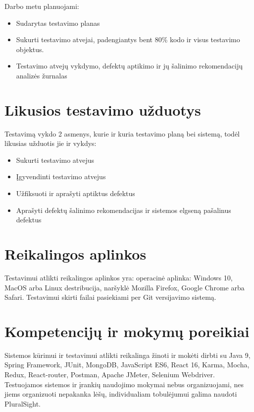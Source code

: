 \documentclass{VUMIFPSkursinis}
\begin{document}
    Darbo metu planuojami: 

    \begin{itemize}
    	\item Sudarytas testavimo planas
    	\item Sukurti testavimo atvejai, padengiantys bent 80\% kodo ir visus testavimo objektus.
    	\item Testavimo atvejų vykdymo, defektų aptikimo ir jų šalinimo rekomendacijų analizės žurnalas
    \end{itemize}

    \section{Likusios testavimo užduotys}

    Testavimą vykdo 2 asmenys, kurie ir kuria testavimo planą bei sistemą, todėl likusias užduotis jie ir vykdys:

    \begin{itemize}
    	\item Sukurti testavimo atvejus
    	\item Įgyvendinti testavimo atvejus
    	\item Užfiksuoti ir aprašyti aptiktus defektus
    	\item Aprašyti defektų šalinimo rekomendacijas ir sistemos elgseną pašalinus defektus
    \end{itemize}

    \section{Reikalingos aplinkos}

    Testavimui atlikti reikalingos aplinkos yra: operacinė aplinka: Windows 10, MacOS arba Linux destribucija, naršyklė Mozilla Firefox, Google Chrome arba Safari. 
    Testavimui skirti failai pasiekiami per Git versijavimo sistemą. 

    \section{Kompetencijų ir mokymų poreikiai}

    Sistemos kūrimui ir testavimui atlikti reikalinga žinoti ir mokėti dirbti su Java 9, Spring Framework, JUnit,
     MongoDB, JavaScript ES6, React 16, Karma, Mocha, Redux, React-router, Postman, Apache JMeter, Selenium Webdriver. 
    Testuojamos sistemos ir įrankių naudojimo mokymai nebus organizuojami, nes jiems organizuoti nepakanka lėšų, individualiam tobulėjumui galima naudoti PluralSight.
\end{document}
